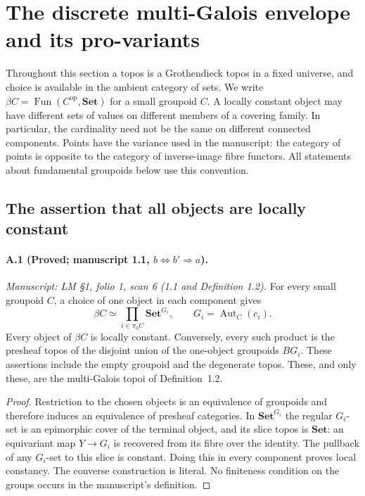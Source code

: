 \section{The discrete multi-Galois envelope and its pro-variants}
\label{sec:A}

Throughout this section a topos is a Grothendieck topos in a fixed universe, and choice is available in the ambient category of sets. We write $\beta C=\operatorname{Fun}(C^{\mathrm{op}},\mathbf{Set})$ for a small groupoid $C$. A locally constant object may have different sets of values on different members of a covering family. In particular, the cardinality need not be the same on different connected components. Points have the variance used in the manuscript: the category of points is opposite to the category of inverse-image fibre functors. All statements about fundamental groupoids below use this convention.

\subsection{The assertion that all objects are locally constant}

\paragraph{A.1 (Proved; manuscript 1.1, $b\Leftrightarrow b'\Rightarrow a$).}
\textit{Manuscript: LM \S1, folio 1, scan 6 (1.1 and Definition 1.2).}
For every small groupoid $C$, a choice of one object in each component gives
\[
 \beta C\simeq\prod_{i\in\pi_0C}\mathbf{Set}^{G_i},
 \qquad G_i=\operatorname{Aut}_C(c_i).
\]
Every object of $\beta C$ is locally constant. Conversely, every such product is the presheaf topos of the disjoint union of the one-object groupoids $BG_i$. These assertions include the empty groupoid and the degenerate topos. These, and only these, are the multi-Galois topoi of Definition~1.2.
\begin{proof}
Restriction to the chosen objects is an equivalence of groupoids and therefore induces an equivalence of presheaf categories. In $\mathbf{Set}^{G_i}$ the regular $G_i$-set is an epimorphic cover of the terminal object, and its slice topos is $\mathbf{Set}$: an equivariant map $Y\to G_i$ is recovered from its fibre over the identity. The pullback of any $G_i$-set to this slice is constant. Doing this in every component proves local constancy. The converse construction is literal. No finiteness condition on the groups occurs in the manuscript's definition. 
\end{proof}

